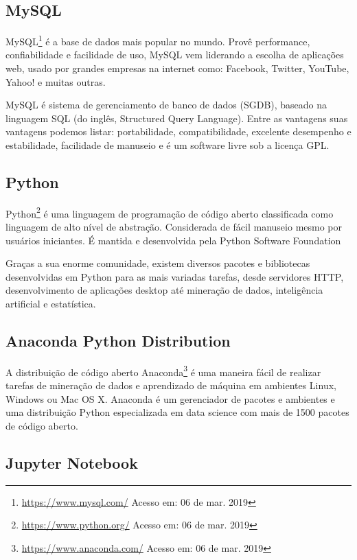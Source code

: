 \subsection{MySQL}

MySQL\footnote{\url{https://www.mysql.com/} Acesso em: 06 de mar. 2019} é a base
de dados mais popular no mundo. Provê performance, confiabilidade e facilidade
de uso, MySQL vem liderando a escolha de aplicações web, usado por grandes
empresas na internet como: Facebook, Twitter, YouTube, Yahoo! e muitas outras.

MySQL é sistema de gerenciamento de banco de dados (SGDB), baseado na linguagem
SQL (do inglês, Structured Query Language). Entre as vantagens suas vantagens
podemos listar: portabilidade, compatibilidade, excelente desempenho e
estabilidade, facilidade de manuseio e é um software livre sob a licença GPL.

\subsection{Python}

Python\footnote{\url{https://www.python.org/} Acesso em: 06 de mar. 2019} é uma
linguagem de programação de código aberto classificada como linguagem de alto
nível de abstração. Considerada de fácil manuseio mesmo por usuários iniciantes.
É mantida e desenvolvida pela Python Software Foundation

Graças a sua enorme comunidade, existem diversos pacotes e bibliotecas
desenvolvidas em Python para as mais variadas tarefas, desde servidores HTTP,
desenvolvimento de aplicações desktop até mineração de dados, inteligência
artificial e estatística.

\subsection{Anaconda Python Distribution}

A distribuição de código aberto
Anaconda\footnote{\url{https://www.anaconda.com/} Acesso em: 06 de mar. 2019}  é
uma maneira fácil de realizar tarefas de mineração de dados e aprendizado de
máquina em ambientes Linux, Windows ou Mac OS X. Anaconda é um gerenciador de
pacotes e ambientes e uma distribuição Python especializada em data science com
mais de 1500 pacotes de código aberto.

\subsection{Jupyter Notebook}


